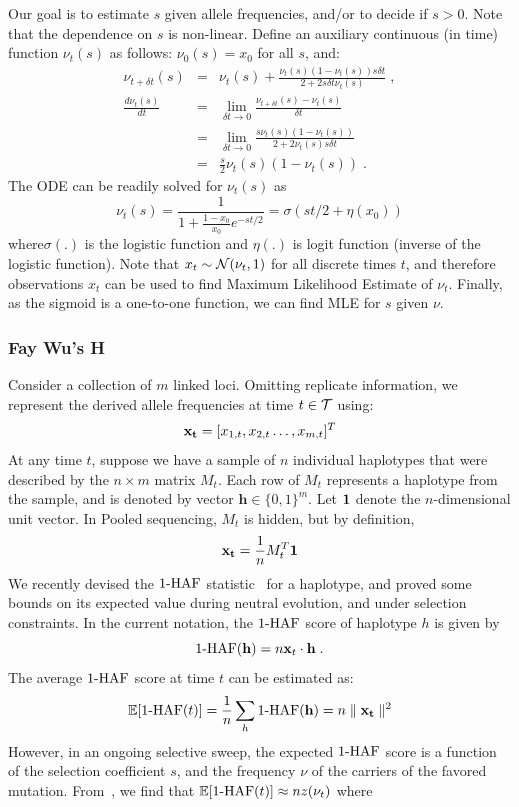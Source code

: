 \documentclass[11pt]{article}
\begin{document}
Our goal is to estimate $s$ given allele frequencies, and/or to decide
if $s>0$. Note that the dependence on $s$ is non-linear. Define an
auxiliary continuous (in time) function $\nu_t(s)$ as follows:
$\nu_0(s)=x_0$ for all $s$, and:
\begin{eqnarray}
\nu_{t+\delta t}(s) &=& \nu_t(s)+\frac{\nu_t(s)(1-\nu_t(s))s\delta 
	t}{2+2s\delta t \nu_t(s)}\;,\\
\frac{d\nu_t(s)}{dt} &=&\lim_{\delta t\rightarrow 0}\frac{\nu_{t+\delta t}(s) 
	-\nu_t(s)}{\delta t}\\
&=&\lim_{\delta t\rightarrow 
	0}\frac{s\nu_t(s)(1-\nu_t(s))}{2+2\nu_t(s)s\delta t}\\
&=& \frac{s}{2}\nu_t(s)(1-\nu_t(s)) \;.
\label{eq:ode}
\end{eqnarray}
The ODE can be readily solved for $\nu_t(s)$ as
\begin{equation}
\nu_t(s) =\frac{1}{1+\frac{1-x_0}{x_0}e^{-st/2}} = \sigma(st/2+\eta(x_0)) 
\label{eq:inf-pop}
\end{equation}
where$\sigma(.)$ is the logistic
function and $\eta(.)$ is logit function (inverse of the logistic function). Note 
that $x_t\sim{\cal N}(\nu_t,1)$ for all discrete times $t$,
and therefore observations $x_t$ can be used to find Maximum
Likelihood Estimate of $\nu_t$. Finally, as the sigmoid is a
one-to-one function, we can find MLE for $s$ given {\bf $\nu$}.
\subsubsection{Fay Wu's H}
Consider a collection of $m$ linked loci. Omitting replicate
information, we represent the derived allele frequencies at time $t\in
{\cal T}$ using:
\[
{\bf x_t} = [x_{1,t},x_{2,t}\ldots,x_{m,t}]^T 
\]
At any time $t$, suppose we have a sample of $n$ individual haplotypes
that were described by the $n\times m$ matrix $M_t$. Each row of $M_t$
represents a haplotype from the sample, and is denoted by vector
$\mathbf{h} \in \{0,1\}^m$. Let ${\mathbf{1}}$ denote the
$n$-dimensional unit vector. In Pooled sequencing, $M_t$ is hidden,
but by definition,
\[
\mathbf{x_t} = \frac{1}{n} M_t^T{\mathbf{1}}
\]
We recently devised the $1\text{-HAF}$ statistic~\cite{ronen2015predicting} for a
haplotype, and proved some bounds on its expected value during neutral
evolution, and under selection constraints. In the current notation,
the $1\text{-HAF}$ score of haplotype $h$ is given by
\begin{equation}
1\text{-HAF}(\mathbf{h})=n{\mathbf x}_t \cdot \mathbf{h}
\;.
\label{eq:1-HAF_SNPmatrix}
\end{equation}
The average $1\text{-HAF}$ score at time $t$ can be estimated as:
\begin{equation} 
\mathbb{E}[1\text{-HAF}(t)]=\frac{1}{n}\sum_h 1\text{-HAF}(\mathbf{h}) = n\parallel 
\mathbf{x_t}\parallel^2
\end{equation} 
However, in an ongoing selective sweep, the expected $1\text{-HAF}$ score is
a function of the selection coefficient $s$, and the frequency $\nu$
of the carriers of the favored mutation. From~\cite{ronen2015predicting}, we
find that $ \mathbb{E}[1\text{-HAF}(t)]\approx nz(\nu_t)$ where
\end{document}
